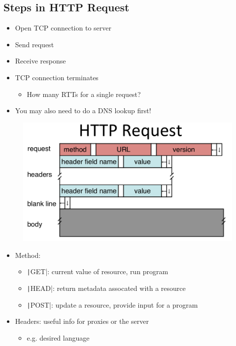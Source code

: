 \subsection{Steps in HTTP Request}
\begin{itemize}[nosep]
    \item Open TCP connection to server
    \item Send request
    \item Receive response
    \item TCP connection terminates
          \begin{itemize}[nosep]
              \item How many RTTs for a single request?
          \end{itemize}
    \item You may also need to do a DNS lookup first!
\end{itemize}
\begin{figure}[H]
    \includegraphics[width=\textwidth]{lazy/httprequest.png}
\end{figure}
\begin{itemize}[nosep]
    \item Method:
          \begin{itemize}[nosep]
              \item \texttt|GET|: current value of resource, run program
              \item \texttt|HEAD|: return metadata assocated with a resource
              \item \texttt|POST|: update a resource, provide input for a program
          \end{itemize}
    \item Headers: useful info for proxies or the server
          \begin{itemize}[nosep]
              \item e.g. desired language
          \end{itemize}
\end{itemize}

